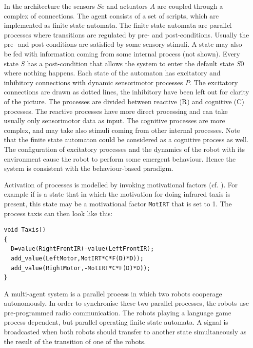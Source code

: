 In the architecture the sensors $Se$ and actuators $A$ are coupled through a complex of connections. The agent consists of a set of scripts, which are implemented as finite state automata. The finite state automata are parallel processes where transitions are regulated by pre- and post-conditions. Usually the pre- and post-conditions are satisfied by some sensory stimuli. A state may also be fed with information coming from some internal process (not shown). Every state $S$ has a post-condition that allows the system to enter the default state $S0$ where nothing happens. Each state of the automaton has excitatory and inhibitory connections with dynamic sensorimotor processes $P$. The excitatory connections are drawn as dotted lines, the inhibitory have been left out for clarity of the picture. The processes are divided between reactive (R) and cognitive (C) processes. The reactive processes have more direct processing and can take usually only sensorimotor data as input. The cognitive processes are more complex, and may take also stimuli coming from other internal processes. Note that the finite state automaton could be considered as a cognitive process as well. The configuration of excitatory processes and the dynamics of the robot with its environment cause the robot to perform some emergent behaviour. Hence the system is consistent with the behaviour-based paradigm.

Activation of processes is modelled by invoking motivational factors (cf. \citealt{steels:1996d,jaeger:1997}). For example if is a state that in which the motivation for doing infrared taxis is present, this state may be a motivational factor \texttt{MotIRT} that is set to 1. The process taxis can then look like this:

{\small\begin{verbatim}
void Taxis()
{
  D=value(RightFrontIR)-value(LeftFrontIR);
  add_value(LeftMotor,MotIRT*C*F(D)*D));
  add_value(RightMotor,-MotIRT*C*F(D)*D));
}
\end{verbatim}}


A multi-agent system is a parallel process in which two robots cooperage autonomously. In order to synchronise these two parallel processes, the robots use pre-programmed radio communication. The robots playing a language game process dependent, but parallel operating finite state automata. A signal is broadcasted when both robots should transfer to another state simultaneously as the result of the transition of one of the robots.

